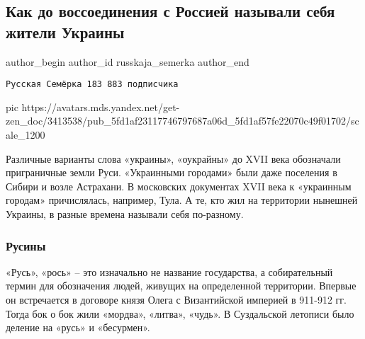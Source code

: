  
 
 
 
 
 
\subsection{Как до воссоединения с Россией называли себя жители Украины}
\label{sec:10_12_2020.sites.ru.zen_yandex.russkaja_semerka.1.zhiteli_ukrainy_nazvanie}
\ifcmt
	author_begin
   author_id russkaja_semerka
	author_end
\fi

\begin{verbatim}
Русская Семёрка 183 883 подписчика
\end{verbatim}

\ifcmt
pic https://avatars.mds.yandex.net/get-zen_doc/3413538/pub_5fd1af23117746797687a06d_5fd1af57fe22070c49f01702/scale_1200
\fi

Различные варианты слова «украины», «оукрайны» до XVII века обозначали
приграничные земли Руси. «Украинными городами» были даже поселения в Сибири и
возле Астрахани. В московских документах XVII века к «украинным городам»
причислялась, например, Тула. А те, кто жил на территории нынешней Украины, в
разные времена называли себя по-разному.

\subsubsection{Русины}

«Русь», «рось» – это изначально не название государства, а собирательный
термин для обозначения людей, живущих на определенной территории. Впервые
он встречается в договоре князя Олега с Византийской империей в 911-912
гг. Тогда бок о бок жили «мордва», «литва», «чудь». В Суздальской летописи
было деление на «русь» и «бесурмен».

